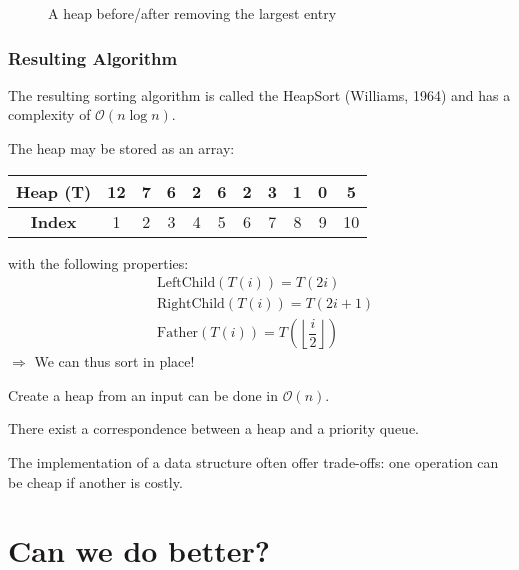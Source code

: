 \begin{figure}[htbp]
\centering
{}
\caption{A heap before/after removing the largest entry}
\label{cm2:tree4-5}
\end{figure}

\subsubsection{Resulting Algorithm}

The resulting sorting algorithm is called the HeapSort (Williams, 1964) and has a complexity of $\mathcal{O}(n\log n)$.

\begin{remark} The heap may be stored as an array: \\
\begin{center}
\begin{tabular}{|c|c|c|c|c|c|c|c|c|c|c|}
   \hline
   \textbf{Heap (T)} & 12 & 7 & 6 & 2 & 6 & 2 & 3 & 1 & 0 & 5 \\
   \hline 
   \textbf{Index} & 1 & 2 & 3 & 4 & 5 & 6 & 7 & 8 & 9 & 10 \\
   \hline
\end{tabular}
\end{center} 
\vspace*{0.4 cm} 
with the following properties:
\begin{align*}
& \text{LeftChild}(T(i)) = T(2i) \\
& \text{RightChild}(T(i)) = T(2i+1) \\
& \text{Father}(T(i)) = T\left( \left\lfloor\dfrac{i}{2}\right\rfloor \right)
\end{align*}
$\Rightarrow $ We can thus sort in place!
\end{remark}
\begin{remark} Create a heap from an input can be done in $\mathcal{O}(n)$.
\end{remark}
\begin{remark} There exist a correspondence between a heap and a priority queue.
\end{remark}
\begin{remark} The implementation of a data structure often offer trade-offs: one operation can be cheap if another is costly. 
\end{remark}

\section{Can we do better?}

